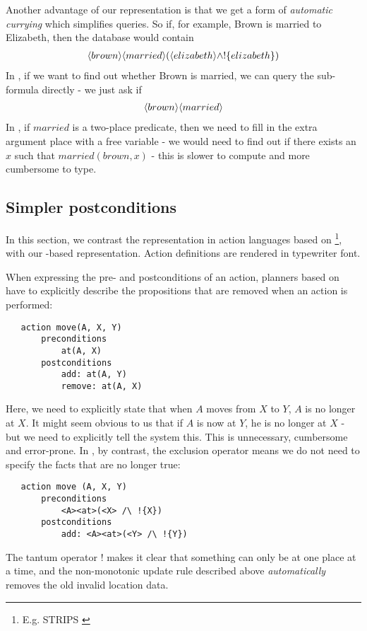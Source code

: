 Another advantage of our representation is that we get a form of \emph{automatic currying} which simplifies queries.
So if, for example, Brown is married to Elizabeth, then the database would contain 
\begin{eqnarray*}
\langle brown \rangle \langle married \rangle (\langle elizabeth \rangle \land ! \{elizabeth\})
\end{eqnarray*}
In \cathoristic{}, if we want to find out whether Brown is married, we can query the sub-formula directly -  we just ask if 
\begin{eqnarray*}
\langle brown \rangle \langle married \rangle \end{eqnarray*}
In \fol, if $married$ is a two-place predicate, then we need to fill in the extra argument place with a free variable - we would need to find out if there exists an $x$ such that $married(brown, x)$ - this is slower to compute and more cumbersome to type. 

\subsection{Simpler postconditions}

In this section, we contrast the representation in action languages based on \fol{}\footnote{E.g. STRIPS \cite{strips}}, with our \cathoristic{}-based representation.
Action definitions are rendered in typewriter font.

When expressing the pre- and postconditions of an action, planners
based on \fol{} have to explicitly describe the propositions that
are removed when an action is performed:
\begin{verbatim}
   action move(A, X, Y)
       preconditions
           at(A, X)
       postconditions
           add: at(A, Y) 
           remove: at(A, X)
\end{verbatim}
Here, we need to explicitly state that when $A$ moves from $X$ to $Y$, $A$ is no longer at $X$. It might seem obvious to us that if $A$ is now at $Y$, he is no longer at $X$ - but we need to explicitly tell the system this. This is unnecessary, cumbersome and error-prone. In \cathoristic{}, by contrast, the exclusion operator means we do not need to specify the facts that are no longer true:
\begin{verbatim}
   action move (A, X, Y)
       preconditions
           <A><at>(<X> /\ !{X})
       postconditions
           add: <A><at>(<Y> /\ !{Y})
\end{verbatim}
The tantum operator $!$ makes it clear that something can only be at one
place at a time, and the non-monotonic update rule described above
\emph{automatically} removes the old invalid location data.

